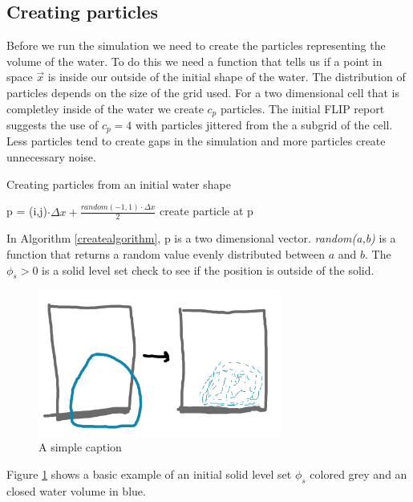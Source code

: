 \subsection{Creating particles}

Before we run the simulation we need to create the particles representing the volume of the water. To do this we need a function that tells us if a point in space $\vec{x}$ is inside our outside of the initial shape of the water. The distribution of particles depends on the size of the grid used. For a two dimensional cell that is completley inside of the water we create $c_p$ particles. The initial FLIP report suggests the use of $c_p = 4$ with particles jittered from the a subgrid of the cell. Less particles tend to create gaps in the simulation and more particles create unnecessary noise. 

\begin{algorithm}
\caption{Creating particles from an initial water shape}
\begin{algorithmic}
\STATE p = (i,j)$\cdot \Delta x +\frac{random(-1,1) \cdot \Delta x}{2}$
\STATE create particle at p
\ENDIF
\ENDFOR
\ENDFOR
\ENDFOR
\end{algorithmic}
\label{createalgorithm}
\end{algorithm}

In Algorithm \ref{createalgorithm}, p is a two dimensional vector. {\it random(a,b)} is a function that returns a random value evenly distributed between $a$ and $b$. The $\phi_s > 0$ is a solid level set check to see if the position is outside of the solid.

\begin{figure}[ht!]
\centering
\includegraphics[width=80mm]{ch3/create.png}
\caption{A simple caption}
\label{createexample}
\end{figure}

Figure \ref{createexample} shows a basic example of an initial solid level set $\phi_s$ colored grey and an closed water volume in blue.
